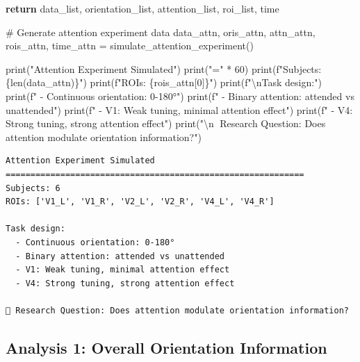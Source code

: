 \documentclass[
  11pt,
  letterpaper,
  oneside,
  openany]{book}
\newenvironment{Shaded}{\begin{snugshade}}{\end{snugshade}}
\newcommand{\BuiltInTok}[1]{\textcolor[rgb]{0.00,0.23,0.31}{#1}}
\newcommand{\CharTok}[1]{\textcolor[rgb]{0.13,0.47,0.30}{#1}}
\newcommand{\CommentTok}[1]{\textcolor[rgb]{0.37,0.37,0.37}{#1}}
\newcommand{\ControlFlowTok}[1]{\textcolor[rgb]{0.00,0.23,0.31}{\textbf{#1}}}
\newcommand{\DecValTok}[1]{\textcolor[rgb]{0.68,0.00,0.00}{#1}}
\newcommand{\NormalTok}[1]{\textcolor[rgb]{0.00,0.23,0.31}{#1}}
\newcommand{\OperatorTok}[1]{\textcolor[rgb]{0.37,0.37,0.37}{#1}}
\newcommand{\SpecialCharTok}[1]{\textcolor[rgb]{0.37,0.37,0.37}{#1}}
\newcommand{\SpecialStringTok}[1]{\textcolor[rgb]{0.13,0.47,0.30}{#1}}
\newcommand{\StringTok}[1]{\textcolor[rgb]{0.13,0.47,0.30}{#1}}
\begin{document}
\begin{Shaded}
\begin{Highlighting}[]
    \ControlFlowTok{return}\NormalTok{ data\_list, orientation\_list, attention\_list, roi\_list, time}

\CommentTok{\# Generate attention experiment data}
\NormalTok{data\_attn, oris\_attn, attn\_attn, rois\_attn, time\_attn }\OperatorTok{=}\NormalTok{ simulate\_attention\_experiment()}

\BuiltInTok{print}\NormalTok{(}\StringTok{"Attention Experiment Simulated"}\NormalTok{)}
\BuiltInTok{print}\NormalTok{(}\StringTok{"="} \OperatorTok{*} \DecValTok{60}\NormalTok{)}
\BuiltInTok{print}\NormalTok{(}\SpecialStringTok{f"Subjects: }\SpecialCharTok{\{}\BuiltInTok{len}\NormalTok{(data\_attn)}\SpecialCharTok{\}}\SpecialStringTok{"}\NormalTok{)}
\BuiltInTok{print}\NormalTok{(}\SpecialStringTok{f"ROIs: }\SpecialCharTok{\{}\NormalTok{rois\_attn[}\DecValTok{0}\NormalTok{]}\SpecialCharTok{\}}\SpecialStringTok{"}\NormalTok{)}
\BuiltInTok{print}\NormalTok{(}\SpecialStringTok{f"}\CharTok{\textbackslash{}n}\SpecialStringTok{Task design:"}\NormalTok{)}
\BuiltInTok{print}\NormalTok{(}\SpecialStringTok{f"  {-} Continuous orientation: 0{-}180°"}\NormalTok{)}
\BuiltInTok{print}\NormalTok{(}\SpecialStringTok{f"  {-} Binary attention: attended vs unattended"}\NormalTok{)}
\BuiltInTok{print}\NormalTok{(}\SpecialStringTok{f"  {-} V1: Weak tuning, minimal attention effect"}\NormalTok{)}
\BuiltInTok{print}\NormalTok{(}\SpecialStringTok{f"  {-} V4: Strong tuning, strong attention effect"}\NormalTok{)}
\BuiltInTok{print}\NormalTok{(}\StringTok{"}\CharTok{\textbackslash{}n}\StringTok{🎯 Research Question: Does attention modulate orientation information?"}\NormalTok{)}
\end{Highlighting}
\end{Shaded}

\begin{verbatim}
Attention Experiment Simulated
============================================================
Subjects: 6
ROIs: ['V1_L', 'V1_R', 'V2_L', 'V2_R', 'V4_L', 'V4_R']

Task design:
  - Continuous orientation: 0-180°
  - Binary attention: attended vs unattended
  - V1: Weak tuning, minimal attention effect
  - V4: Strong tuning, strong attention effect

🎯 Research Question: Does attention modulate orientation information?
\end{verbatim}

\subsection{Analysis 1: Overall Orientation
Information}\label{analysis-1-overall-orientation-information}
\end{document}
